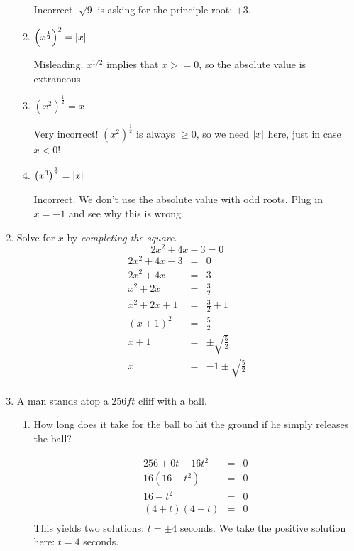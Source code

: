 \documentclass[letterpaper,12pt,fleqn]{article}
\begin{document}
\begin{enumerate}
\begin{enumerate}
Incorrect. $\sqrt{9}$ is asking for the principle root: $+3$.

\item $\left(x^{\frac{1}{2}}\right)^2=\lvert x\rvert$

Misleading. $x^{1/2}$ implies that $x>=0$, so the absolute value is extraneous.

\item $\left(x^2\right)^{\frac{1}{2}}=x$

Very incorrect! $\left(x^2\right)^{\frac{1}{2}}$ is always $\ge0$, so we need
$\lvert x\rvert$ here, just in case $x<0$!

\item $\left(x^3\right)^{\frac{1}{3}}=\lvert x\rvert$

Incorrect. We don't use the absolute value with odd roots. Plug in $x=-1$ and
see why this is wrong.
\end{enumerate}

\bigskip

\item Solve for $x$ by \emph{completing the square}.
\[2x^2+4x-3=0\]
\begin{eqnarray*}
2x^2+4x-3 &=& 0 \\
2x^2+4x &=& 3 \\
x^2+2x &=& \frac{3}{2} \\
x^2+2x+1 &=& \frac{3}{2}+1 \\
(x+1)^2 &=& \frac{5}{2} \\
x+1 &=& \pm\sqrt{\frac{5}{2}} \\
x &=& -1\pm\sqrt{\frac{5}{2}} \\
\end{eqnarray*}

\bigskip

\item A man stands atop a $256ft$ cliff with a  ball.
\begin{enumerate}
\item How long does it take for the ball to hit the ground if he simply
releases the ball?

\begin{eqnarray*}
256+0t-16t^2 &=& 0 \\
16(16-t^2) &=& 0 \\
16-t^2 &=& 0 \\
(4+t)(4-t) &=& 0 \\
\end{eqnarray*}
This yields two solutions: $t=\pm4$ seconds. We take the positive solution
here: $t=4$ seconds.

\bigskip


\end{enumerate}
\end{enumerate}
\end{document}
